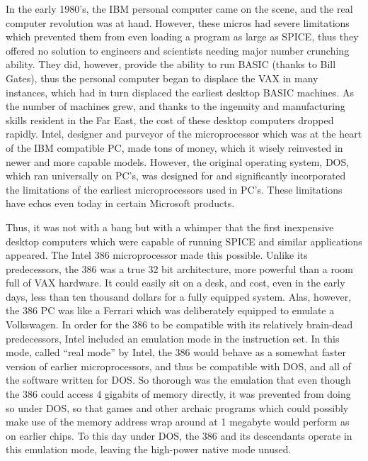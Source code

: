 In the early 1980's, the IBM personal computer came on the scene, and
the real computer revolution was at hand.  However, these micros had
severe limitations which prevented them from even loading a program as
large as SPICE, thus they offered no solution to engineers and
scientists needing major number crunching ability.  They did, however,
provide the ability to run BASIC (thanks to Bill Gates), thus the
personal computer began to displace the VAX in many instances, which
had in turn displaced the earliest desktop BASIC machines.  As the
number of machines grew, and thanks to the ingenuity and manufacturing
skills resident in the Far East, the cost of these desktop computers
dropped rapidly.  Intel, designer and purveyor of the microprocessor
which was at the heart of the IBM compatible PC, made tons of money,
which it wisely reinvested in newer and more capable models.  However,
the original operating system, DOS, which ran universally on PC's, was
designed for and significantly incorporated the limitations of the
earliest microprocessors used in PC's.  These limitations have echos
even today in certain Microsoft products.

Thus, it was not with a bang but with a whimper that the first
inexpensive desktop computers which were capable of running SPICE and
similar applications appeared.  The Intel 386 microprocessor made this
possible.  Unlike its predecessors, the 386 was a true 32 bit
architecture, more powerful than a room full of VAX hardware.  It
could easily sit on a desk, and cost, even in the early days, less
than ten thousand dollars for a fully equipped system.  Alas, however,
the 386 PC was like a Ferrari which was deliberately equipped to
emulate a Volkswagen.  In order for the 386 to be compatible with its
relatively brain-dead predecessors, Intel included an emulation mode
in the instruction set.  In this mode, called ``real mode'' by Intel,
the 386 would behave as a somewhat faster version of earlier
microprocessors, and thus be compatible with DOS, and all of the
software written for DOS.  So thorough was the emulation that even
though the 386 could access 4 gigabits of memory directly, it was
prevented from doing so under DOS, so that games and other archaic
programs which could possibly make use of the memory address wrap
around at 1 megabyte would perform as on earlier chips.  To this day
under DOS, the 386 and its descendants operate in this emulation mode,
leaving the high-power native mode unused.

